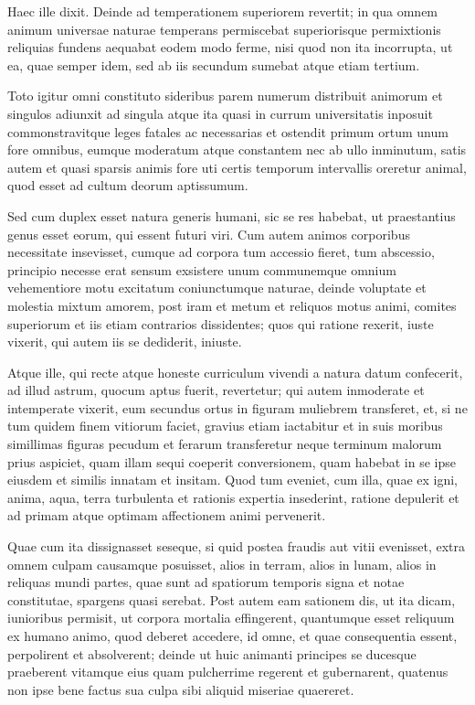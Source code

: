  Haec ille dixit. Deinde ad temperationem superiorem revertit; in qua omnem animum universae naturae temperans permiscebat superiorisque permixtionis reliquias fundens aequabat eodem modo ferme, nisi quod non ita incorrupta, ut ea, quae semper idem, sed ab iis secundum sumebat atque etiam tertium.

 Toto igitur omni constituto sideribus parem numerum distribuit animorum et singulos adiunxit ad singula atque ita quasi in currum universitatis inposuit commonstravitque leges fatales ac necessarias et ostendit primum ortum unum fore omnibus, eumque moderatum atque constantem nec ab ullo inminutum, satis autem et quasi sparsis animis fore uti certis temporum intervallis oreretur animal, quod esset ad cultum deorum aptissumum.

 Sed cum duplex esset natura generis humani, sic se res habebat, ut praestantius genus esset eorum, qui essent futuri viri. Cum autem animos corporibus necessitate insevisset, cumque ad corpora tum accessio fieret, tum abscessio, principio necesse erat sensum exsistere unum communemque omnium vehementiore motu excitatum coniunctumque naturae, deinde voluptate et molestia mixtum amorem, post iram et metum et reliquos motus animi, comites superiorum et iis etiam contrarios dissidentes; quos qui ratione rexerit, iuste vixerit, qui autem iis se dediderit, iniuste.

 Atque ille, qui recte atque honeste curriculum vivendi a natura datum confecerit, ad illud astrum, quocum aptus fuerit, revertetur; qui autem inmoderate et intemperate vixerit, eum secundus ortus in figuram muliebrem transferet, et, si ne tum quidem finem vitiorum faciet, gravius etiam iactabitur et in suis moribus simillimas figuras pecudum et ferarum transferetur neque terminum malorum prius aspiciet, quam illam sequi coeperit conversionem, quam habebat in se ipse eiusdem et similis innatam et insitam. Quod tum eveniet, cum illa, quae ex igni, anima, aqua, terra turbulenta et rationis expertia insederint, ratione depulerit et ad primam atque optimam affectionem animi pervenerit.

 Quae cum ita dissignasset seseque, si quid postea fraudis aut vitii evenisset, extra omnem culpam causamque posuisset, alios in terram, alios in lunam, alios in reliquas mundi partes, quae sunt ad spatiorum temporis signa et notae constitutae, spargens quasi serebat. Post autem eam sationem dis, ut ita dicam, iunioribus permisit, ut corpora mortalia effingerent, quantumque esset reliquum ex humano animo, quod deberet accedere, id omne, et quae consequentia essent, perpolirent et absolverent; deinde ut huic animanti principes se ducesque praeberent vitamque eius quam pulcherrime regerent et gubernarent, quatenus non ipse bene factus sua culpa sibi aliquid miseriae quaereret.

